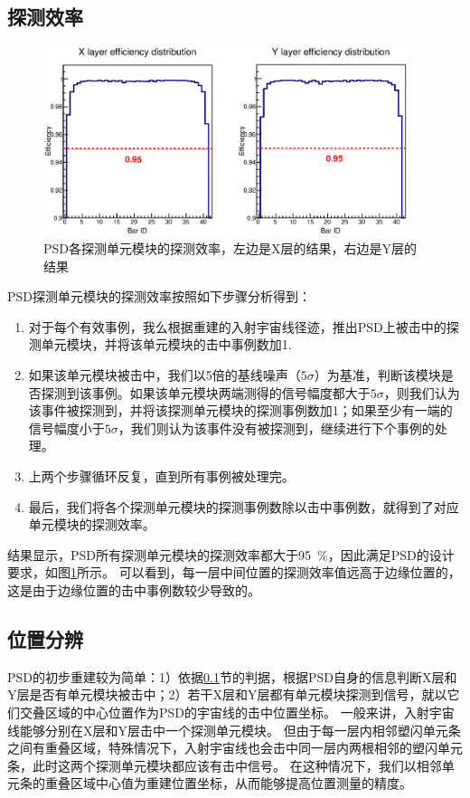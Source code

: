 \subsection{探测效率}
\label{sec:cosmic_ray:efficiency}
\begin{figure}[!h]
	\centering
	\includegraphics[width=0.95\textwidth]{chap/cosmic_ray/fig/efficiency.eps}
	\caption{PSD各探测单元模块的探测效率，左边是X层的结果，右边是Y层的结果}
	\label{fig:cosmic_ray:efficiency}
\end{figure}
PSD探测单元模块的探测效率按照如下步骤分析得到：
\begin{enumerate}
	\item 对于每个有效事例，我么根据重建的入射宇宙线径迹，推出PSD上被击中的探测单元模块，并将该单元模块的击中事例数加1.
	\item 如果该单元模块被击中，我们以5倍的基线噪声（$5\sigma$）为基准，判断该模块是否探测到该事例。如果该单元模块两端测得的信号幅度都大于$5\sigma$，则我们认为该事件被探测到，并将该探测单元模块的探测事例数加1；如果至少有一端的信号幅度小于$5\sigma$，我们则认为该事件没有被探测到，继续进行下个事例的处理。
	\item 上两个步骤循环反复，直到所有事例被处理完。
	\item 最后，我们将各个探测单元模块的探测事例数除以击中事例数，就得到了对应单元模块的探测效率。
\end{enumerate}
结果显示，PSD所有探测单元模块的探测效率都大于\SI{95}{\percent}，因此满足PSD的设计要求，如图\ref{fig:cosmic_ray:efficiency}所示。
可以看到，每一层中间位置的探测效率值远高于边缘位置的，这是由于边缘位置的击中事例数较少导致的。

\subsection{位置分辨}
\label{sec:cosmic_ray:position_resolution}
PSD的初步重建较为简单：1）依据\ref{sec:cosmic_ray:efficiency}节的判据，根据PSD自身的信息判断X层和Y层是否有单元模块被击中；2）若干X层和Y层都有单元模块探测到信号，就以它们交叠区域的中心位置作为PSD的宇宙线的击中位置坐标。
一般来讲，入射宇宙线能够分别在X层和Y层击中一个探测单元模块。
但由于每一层内相邻塑闪单元条之间有重叠区域，特殊情况下，入射宇宙线也会击中同一层内两根相邻的塑闪单元条，此时这两个探测单元模块都应该有击中信号。
在这种情况下，我们以相邻单元条的重叠区域中心值为重建位置坐标，从而能够提高位置测量的精度。

